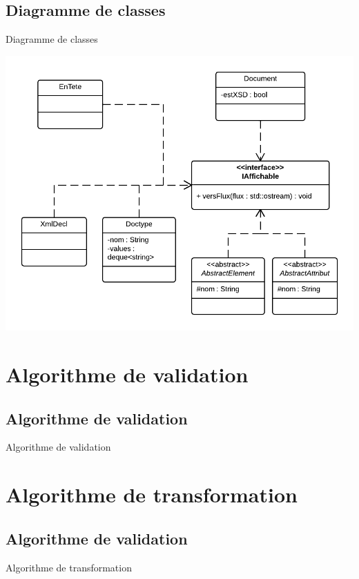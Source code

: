 \documentclass[aspectratio=169]{beamer}
\begin{document}
\subsection{Diagramme de classes}
\begin{frame}{Diagramme de classes}
\begin{center}
  \includegraphics[scale=0.3]{ddc_iaff}
\end{center}
\end{frame}


\section{Algorithme de  validation}
\subsection{Algorithme de  validation}
\begin{frame}{Algorithme de validation}
 
\end{frame}

\section{Algorithme de transformation}
\subsection{Algorithme de  validation}
\begin{frame}{Algorithme de transformation}
 
\end{frame}
\end{document}
